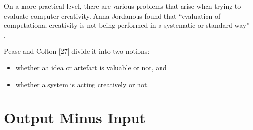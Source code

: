 On a more practical level, there are various problems that arise when trying to evaluate computer creativity. Anna Jordanous found that ``evaluation of computational creativity is not being performed in a systematic or standard way'' \citep[p.2, her emphasis]{Jordanous2011}.

Pease and Colton [27] divide it into two notions: 

\begin{itemize}
  \item whether an idea or artefact is valuable or not, and
  \item whether a system is acting creatively or not.
\end{itemize}


\section{Output Minus Input}

